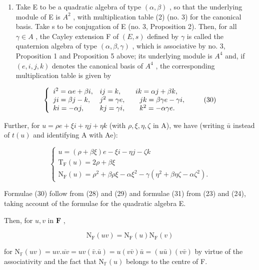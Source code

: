 \begin{enumerate}
\def\labelenumi{(\arabic{enumi})}
\setcounter{enumi}{1}
\tightlist
\item
  Take E to be a quadratic algebra of type \((\alpha, \beta)\) , so that the underlying module of E is \(A^{2}\) , with multiplication table (2) (no. 3) for the canonical basis. Take s to be conjugation of E (no. 3, Proposition 2). Then, for all \(\gamma \in A\) , the Cayley extension F of \((E, s)\) defined by \(\gamma\) is called the quaternion algebra of type \((\alpha, \beta, \gamma)\) , which is associative by no. 3, Proposition 1 and Proposition 5 above; its underlying module is \(A^{4}\) and, if \((e, i, j, k)\) denotes the canonical basis of \(A^{4}\) , the corresponding multiplication table is given by
\end{enumerate}

\[
\left\{ \begin{array}{l l} i ^ {2} = \alpha e + \beta i, & i j = k, \qquad i k = \alpha j + \beta k, \\ j i = \beta j - k, & j ^ {2} = \gamma e, \qquad j k = \beta \gamma e - \gamma i, \\ k i = - \alpha j, & k j = \gamma i, \qquad k ^ {2} = - \alpha \gamma e. \end{array} \right.\tag{30}
\]

Further, for \(u = \rho e + \xi i + \eta j + \eta k\) (with \(\rho, \xi, \eta, \zeta\) in A), we have (writing \(\bar{u}\) instead of \(t(u)\) and identifying A with Ae):

\[
\left\{ \begin{array}{c} u = (\rho + \beta \xi) e - \xi i - \eta j - \zeta k \\ \mathrm{T} _ {\mathrm{F}} (u) = 2 \rho + \beta \xi \\ \mathrm{N} _ {\mathrm{F}} (u) = \rho^ {2} + \beta \rho \xi - \alpha \xi^ {2} - \gamma (\eta^ {2} + \beta \eta \zeta - \alpha \zeta^ {2}). \end{array} \right.\tag{31}
\]

Formulae (30) follow from (28) and (29) and formulae (31) from (23) and (24), taking account of the formulae for the quadratic algebra E.

Then, for \(u, v\) in \(\mathbf{F}\) ,

\[
\mathrm{N} _ {\mathrm{F}} (u v) = \mathrm{N} _ {\mathrm{F}} (u) \mathrm{N} _ {\mathrm{F}} (v)\tag{32}
\]

for \(\mathrm{N}_{\mathbb{F}}(uv)=uv.\overline{uv}=uv(\bar{v}.\bar{u})=u(v\bar{v})\bar{u}=(u\bar{u})(v\bar{v})\) by virtue of the associativity and the fact that \(\mathrm{N}_{\mathbb{F}}(u)\) belongs to the centre of F.

